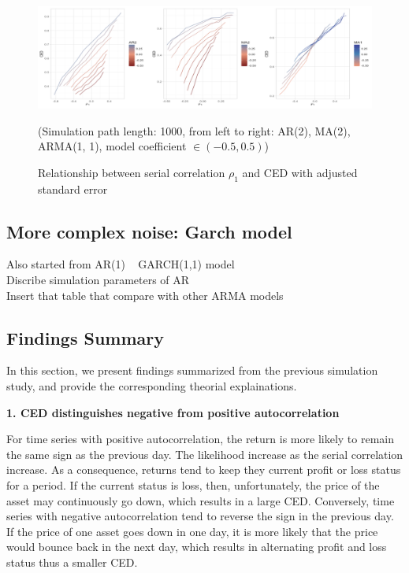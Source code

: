 \documentclass[11pt]{article}
\begin{document}
\begin{figure}[H]
\centering
\includegraphics[width = 1\textwidth]{../figures/simulation/aggregated_adjsd_subset_resized}
\caption{Relationship between serial correlation $\rho_1$ and CED with adjusted standard error}
(Simulation path length: 1000, from left to right: AR(2), MA(2), ARMA(1, 1), model coefficient $\in(-0.5, 0.5)$)
\label{fig:aggregated_adjsd_subset}
\end{figure}

\subsection{More complex noise: Garch model}

Also started from AR(1) ~ GARCH(1,1) model\\
Discribe simulation parameters of AR\\
Insert that table that compare with other ARMA models\\

\subsection{Findings Summary}

In this section, we present findings summarized from the previous simulation study, and provide the corresponding theorial explainations. 

\textbf{1. CED distinguishes negative from positive autocorrelation}

For time series with positive autocorrelation, the return is more likely to remain the same sign as the previous day. The likelihood increase as the serial correlation increase. As a consequence, returns tend to keep they current profit or loss status for a period. If the current status is loss, then, unfortunately, the price of the asset may continuously go down, which results in a large CED. Conversely, time series with negative autocorrelation tend to reverse the sign in the previous day. If the price of one asset goes down in one day, it is more likely that the price would bounce back in the next day, which results in alternating profit and loss status thus a smaller CED.
\end{document}
